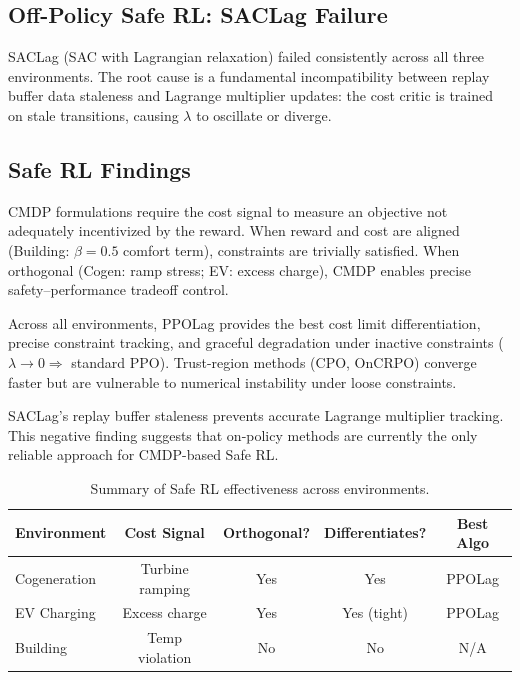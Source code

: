 \subsection{Off-Policy Safe RL: SACLag Failure}
\label{sec:saclag}

SACLag (SAC with Lagrangian relaxation) failed consistently across all three environments. The root cause is a fundamental incompatibility between replay buffer data staleness and Lagrange multiplier updates: the cost critic is trained on stale transitions, causing $\lambda$ to oscillate or diverge.

\subsection{Safe RL Findings}

\begin{finding}
\label{find:orthogonality}
CMDP formulations require the cost signal to measure an objective not adequately incentivized by the reward. When reward and cost are aligned (Building: $\beta = 0.5$ comfort term), constraints are trivially satisfied. When orthogonal (Cogen: ramp stress; EV: excess charge), CMDP enables precise safety--performance tradeoff control.
\end{finding}

\begin{finding}
\label{find:ppolag_best}
Across all environments, PPOLag provides the best cost limit differentiation, precise constraint tracking, and graceful degradation under inactive constraints ($\lambda \to 0 \Rightarrow$ standard PPO). Trust-region methods (CPO, OnCRPO) converge faster but are vulnerable to numerical instability under loose constraints.
\end{finding}

\begin{finding}
\label{find:saclag}
SACLag's replay buffer staleness prevents accurate Lagrange multiplier tracking. This negative finding suggests that on-policy methods are currently the only reliable approach for CMDP-based Safe RL.
\end{finding}

\begin{table}[htbp]
\centering
\caption{Summary of Safe RL effectiveness across environments.}
\label{tab:saferl_summary}
\begin{tabular}{@{}lcccc@{}}
\toprule
\textbf{Environment} & \textbf{Cost Signal} & \textbf{Orthogonal?} & \textbf{Differentiates?} & \textbf{Best Algo} \\
\midrule
Cogeneration & Turbine ramping & Yes & Yes & PPOLag \\
EV Charging & Excess charge & Yes & Yes (tight) & PPOLag \\
Building & Temp violation & No & No & N/A \\
\bottomrule
\end{tabular}
\end{table}

